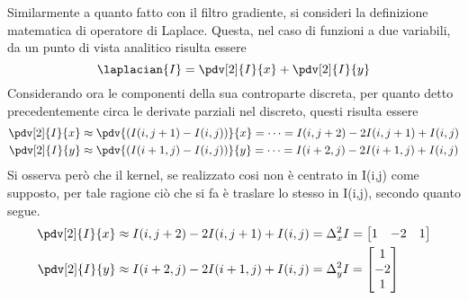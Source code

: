 \documentclass{subfiles}
\begin{document}
Similarmente a quanto fatto con il filtro gradiente, si consideri la definizione matematica di operatore di Laplace.
Questa, nel caso di funzioni a due variabili, da un punto di vista analitico risulta essere
\[
    \laplacian{I} = \pdv[2]{I}{x} + \pdv[2]{I}{y}
\]
Considerando ora le componenti della sua controparte discreta, per quanto detto precedentemente circa le derivate parziali nel discreto, questi risulta essere
\[\begin{aligned}
        \pdv[2]{I}{x} & \approx \pdv{(I(i, j + 1) - I(i,j))}{x} = \cdots = I(i, j + 2) - 2I(i, j + 1) + I(i, j) \\
        \pdv[2]{I}{y} & \approx \pdv{(I(i + 1, j) - I(i,j))}{y} = \cdots = I(i + 2, j) - 2I(i + 1, j) + I(i, j) \\
    \end{aligned}\]
Si osserva però che il kernel, se realizzato cosi non è centrato in I(i,j) come supposto, per tale ragione ciò che si fa è traslare lo stesso in I(i,j),
secondo quanto segue.
\[\begin{aligned}
        \pdv[2]{I}{x} & \approx I(i, j + 2) - 2I(i, j + 1) + I(i, j) = \Delta^{2}_{x}I = \begin{bmatrix}
                                                                                             1 & -2 & 1 \\
                                                                                         \end{bmatrix} \\
        \pdv[2]{I}{y} & \approx I(i + 2, j) - 2I(i + 1, j) + I(i, j) = \Delta^{2}_{y}I = \begin{bmatrix}
                                                                                             1  \\
                                                                                             -2 \\
                                                                                             1  \\
                                                                                         \end{bmatrix} \\
    \end{aligned}\]
\end{document}
